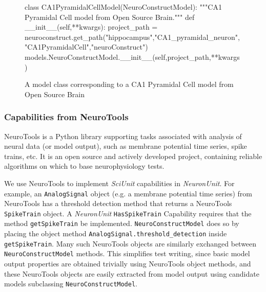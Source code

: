 \documentclass[11pt,letterpaper]{article}
\let\verbx\lstinline
\begin{document}
\begin{figure}
\begin{python}
class CA1PyramidalCellModel(NeuroConstructModel):
	"""CA1 Pyramidal Cell model from Open Source Brain."""
	def __init__(self,**kwargs):
		project_path = neuroconstruct.get_path("hippocampus","CA1_pyramidal_neuron","CA1PyramidalCell","neuroConstruct")
		models.NeuroConstructModel.__init__(self,project_path,**kwargs)
\end{python}
\vspace{-5px}
\caption{A model class corresponding to a CA1 Pyramidal Cell model from Open Source Brain}
\label{fig:ca1_model}
\vspace{-15px}
\end{figure}

\subsubsection{Capabilities from NeuroTools}
NeuroTools\cite{neuralensemble_url} is a Python library supporting tasks associated with analysis of neural data (or model output), such as membrane potential time series, spike trains, etc. 
It is an open source and actively developed project, containing reliable algorithms on which to base neurophysiology tests.

We use NeuroTools to implement \textit{SciUnit} capabilities in \textit{NeuronUnit}. 
For example, an \verbx{AnalogSignal} object (e.g. a membrane potential time series) from NeuroTools has a threshold detection method that returns a NeuroTools \verbx{SpikeTrain} object. 
A \textit{NeuronUnit} \verbx{HasSpikeTrain} Capability requires that the method \verbx{getSpikeTrain} be implemented. 
\verbx{NeuroConstructModel} does so by placing the object method \verbx{AnalogSignal.threshold_detection} inside \verbx{getSpikeTrain}. 
Many such NeuroTools objects are similarly exchanged between \verbx{NeuroConstructModel} methods. 
This simplifies test writing, since basic model output properties are obtained trivially using NeuroTools object methods, and these NeuroTools objects are easily extracted from model output using candidate models subclassing \verbx{NeuroConstructModel}.  
\end{document}

